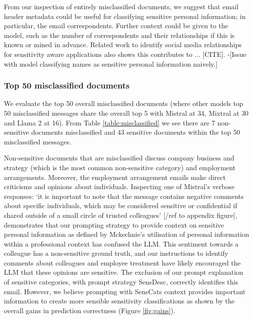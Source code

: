 From our inspection of entirely misclassified documents, we suggest that email header metadata could be useful for classifying sensitive personal information; in particular, the email correspondents. Further context could be given to the model, such as the number of correspondents and their relationships if this is known or mined in advance. Related work to identify social media relationships for sensitivity aware applications also shows this contributes to ... [CITE]. 
-[Issue with model classifying names as sensitive personal information naively.]

\subsubsection{Top 50 misclassified documents}
We evaluate the top 50 overall misclassified documents (where other models top 50 misclassified messages share the overall top 5 with Mistral at 34, Mixtral at 30 and Llama 2 at 16). From Table \ref{table:misclassified} we see there are 7 non-sensitive documents misclassified and 43 sensitive documents within the top 50 misclassified messages.

Non-sensitive documents that are misclassified discuss company business and strategy (which is the most common non-sensitive category) and employment arrangements. Moreover, the employment arrangement emails make direct criticisms and opinions about individuals. Inspecting one of Mistral’s verbose responses: ‘it is important to note that the message contains negative comments about specific individuals, which may be considered sensitive or confidential if shared outside of a small circle of trusted colleagues’ [/ref to appendix figure], demonstrates that our prompting strategy to provide context on sensitive personal information as defined by Mckechnie’s utilisation of personal information within a professional context has confused the LLM. This sentiment towards a colleague has a non-sensitive ground truth, and our instructions to identify comments about colleagues and employee treatment have likely encouraged the LLM that these opinions are sensitive. The exclusion of our prompt explanation of sensitive categories, with prompt strategy SensDesc, correctly identifies this email. However, we believe prompting with SensCats context provides important information to create more sensible sensitivity classifications as shown by the overall gains in prediction correctness (Figure \ref{fig:gains}).

